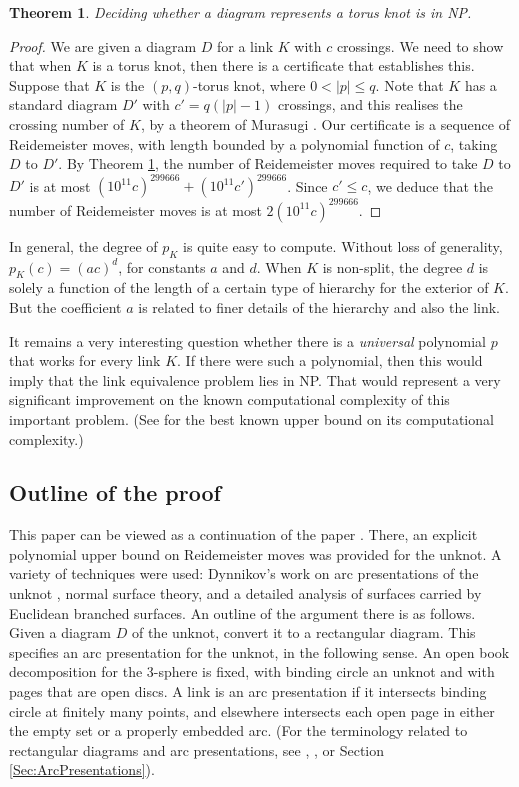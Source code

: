 \documentclass[oneside]{amsart}
\numberwithin{equation}{section}
\theoremstyle{plain}
\newtheorem{theorem}[equation]{Theorem}
\theoremstyle{definition}
\begin{document}
\begin{theorem}
\label{Thm:TorusKnotNP}
Deciding whether a diagram represents a torus knot is in NP.
\end{theorem}

\begin{proof}
We are given a diagram $D$ for a link $K$ with $c$ crossings. 
We need to show that when $K$ is a torus knot, then there is a certificate that establishes this. 
Suppose that $K$ is the $(p,q)$-torus knot, where $0 < |p| \leq q$.
Note that $K$ has a standard diagram $D'$ with $c'= q(|p|-1)$ crossings,
and this realises the crossing number of $K$, by a theorem of Murasugi \cite{Murasugi:Braid}.
Our certificate is a sequence of Reidemeister moves, with length bounded by a polynomial function of $c$,
taking $D$ to $D'$. By Theorem  \ref{Thm:TorusKnotNP}, 
the number of Reidemeister moves required to take $D$ to $D'$
is at most $(10^{11}c)^{299666} + (10^{11}c')^{299666} $.
Since $c' \leq c$, we deduce that the number of Reidemeister moves is at most $2(10^{11}c)^{299666}$.
\end{proof}


In general, the degree of $p_K$ is quite easy to compute. Without loss of generality, $p_K(c) = (ac)^d$, for constants $a$ and $d$. When $K$ is non-split, the degree $d$ is solely a function of the length of a certain type of
hierarchy for the exterior of $K$. But the coefficient $a$ is related to finer details of the hierarchy and also the link.

It remains a very interesting question whether there is a \emph{universal} polynomial $p$ that works for every link $K$. If there were such a polynomial, then this would imply that the link equivalence problem lies in NP. That would represent a very significant improvement on the known computational complexity of this important problem. (See \cite{Kuperberg} for the best known upper bound on its computational complexity.)

\subsection{Outline of the proof}
This paper can be viewed as a continuation of the paper \cite{Lackenby:PolyUnknot}. There, an explicit polynomial
upper bound on Reidemeister moves was provided for the unknot. A variety of techniques were used:
Dynnikov's work on arc presentations of the unknot \cite{Dynnikov}, normal surface theory, and a detailed analysis
of surfaces carried by Euclidean branched surfaces. An outline of the argument there is as follows. Given a diagram $D$
of the unknot, convert it to a rectangular diagram. This specifies an arc presentation for the unknot, in the
following sense. An open book decomposition for the 3-sphere is fixed, with binding circle an unknot and with pages that
are open discs. A link is an arc presentation if it intersects binding circle at finitely many points, and elsewhere
intersects each open page in either the empty set or a properly embedded arc.
(For the terminology related to rectangular diagrams and arc presentations, see \cite{Cromwell}, \cite{Dynnikov}, or Section \ref{Sec:ArcPresentations}).
\end{document}
